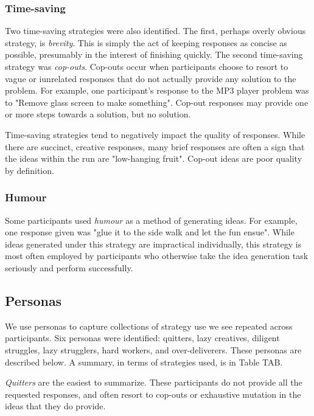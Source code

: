 \subsubsection{Time-saving}

Two time-saving strategies were also identified. The first, perhaps overly obvious strategy, is \emph{brevity}. This is simply the act of keeping responses as concise as possible, presumably in the interest of finishing quickly. The second time-saving strategy was \emph{cop-outs}. Cop-outs occur when participants choose to resort to vague or iunrelated responses that do not actually provide any solution to the problem. For example, one participant's response to the MP3 player problem was to "Remove glass screen to make something". Cop-out responses may provide one or more steps towards a solution, but no solution.

Time-saving strategies tend to negatively impact the quality of responses. While there are succinct, creative responses, many brief responses are often a sign that the ideas within the run are "low-hanging fruit". Cop-out ideas are poor quality by definition.

\subsubsection{Humour}

Some participants used \emph{humour} as a method of generating ideas. For example, one response given was "glue it to the side walk and let the fun ensue". While ideas generated under this strategy are impractical individually, this strategy is most often employed by participants who otherwise take the idea generation task seriously and perform successfully.

\subsection{Personas}

We use personas to capture collections of strategy use we see repeated across participants. 
Six personas were identified: quitters, lazy creatives, diligent struggles, lazy strugglers, hard workers, and over-deliverers. These personas are described below. A summary, in terms of strategies used, is in Table TAB.

\emph{Quitters} are the easiest to summarize. These participants do not provide all the requested responses, and often resort to cop-outs or exhaustive mutation in the ideas that they do provide.

